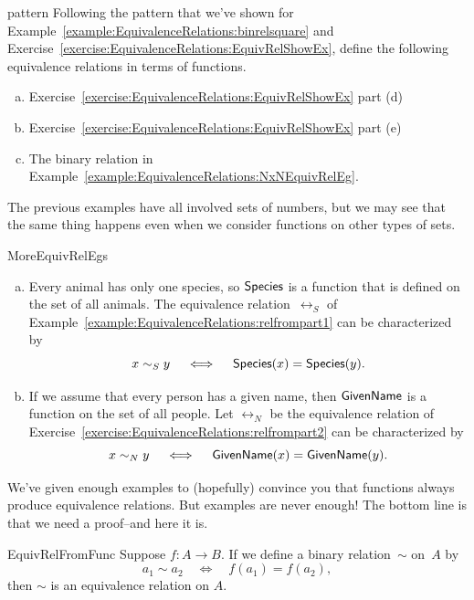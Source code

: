 \begin{exercise}{pattern}
Following the pattern that we've shown for Example~\ref{example:EquivalenceRelations:binrelsquare}  and Exercise~\ref{exercise:EquivalenceRelations:EquivRelShowEx},
define the following equivalence relations in terms of functions.
\begin{enumerate}[(a)]
\item
Exercise~\ref{exercise:EquivalenceRelations:EquivRelShowEx} part (d) 
\item
Exercise~\ref{exercise:EquivalenceRelations:EquivRelShowEx} part (e) 
\item
The binary relation in   Example~\ref{example:EquivalenceRelations:NxNEquivRelEg}.
\end{enumerate}
\end{exercise}


The previous examples have all involved sets of numbers, but we may see that the same thing happens even when we consider functions on other types of sets.

\begin{example}{MoreEquivRelEgs}
\begin{enumerate}[(a)]
\item Every animal has only one species, so $\sf{Species}$ is a function that is defined on the set of all animals. The equivalence relation~$\rel_S$ of Example~\ref{example:EquivalenceRelations:relfrompart1} can be characterized by
\[ x \sim_S y \quad \iff \quad {\sf{S}pecies}(x) = {\sf{S}pecies}(y) .\]
\item If we assume that every person has a given name, then $\sf{GivenName}$ is a function on the set of all people. Let $\rel_N$ be the equivalence relation of Exercise~\ref{exercise:EquivalenceRelations:relfrompart2} can be characterized by
\[  x \sim_N y \quad \iff \quad {\sf{G}ivenName}(x) = {\sf{G}ivenName}(y) .\]
\end{enumerate}
\end{example}

We've given enough examples to (hopefully) convince you that functions always produce equivalence relations. But examples are never enough! The bottom line is that we need a proof--and here it is.

\begin{prop}{EquivRelFromFunc}
Suppose $f \colon A \to B$. If we define a binary relation~$\sim$ on~$A$ by
\[ a_1 \sim a_2 \quad \iff \quad f(a_1) = f(a_2) ,\]
then $\sim$ is an equivalence relation on $A$.
\end{prop}

